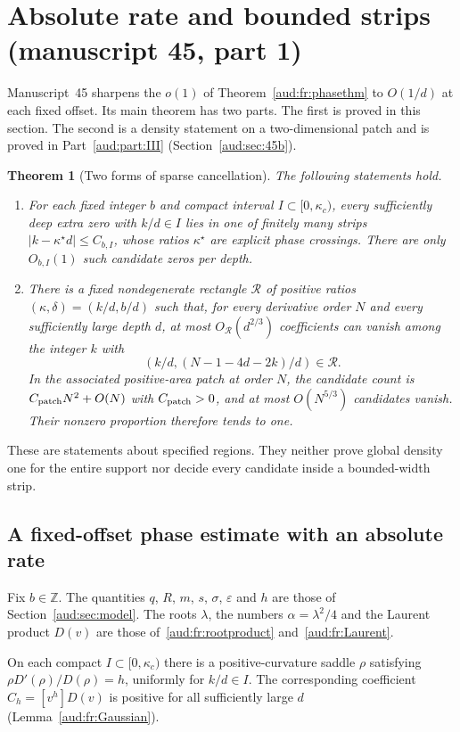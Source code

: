 \documentclass[11pt,a4paper]{article}
\numberwithin{equation}{section}
\newtheorem{theorem}{Theorem}[section]
\begin{document}
\section{Absolute rate and bounded strips (manuscript 45, part 1)}\label{aud:sec:45a}
Manuscript~45 sharpens the $o(1)$ of Theorem~\ref{aud:fr:phasethm} to $O(1/d)$ at each fixed offset. Its main theorem has two parts. The first is proved in this section. The second is a density statement on a two-dimensional patch and is proved in Part~\ref{aud:part:III} (Section~\ref{aud:sec:45b}).

\begin{theorem}[Two forms of sparse cancellation]\label{aud:sc:main}
The following statements hold.
\begin{enumerate}
\item For each fixed integer $b$ and compact interval $I\subset[0,\kappa_c)$, every sufficiently deep extra zero with $k/d\in I$ lies in one of finitely many strips $|k-\kappa^\star d|\le C_{b,I}$, whose ratios $\kappa^\star$ are explicit phase crossings. There are only $O_{b,I}(1)$ such candidate zeros per depth.
\item There is a fixed nondegenerate rectangle $\mathcal R$ of positive ratios $(\kappa,\delta)=(k/d,b/d)$ such that, for every derivative order $N$ and every sufficiently large depth $d$, at most $O_{\mathcal R}(d^{2/3})$ coefficients can vanish among the integer $k$ with
\[
 (k/d,(N-1-4d-2k)/d)\in\mathcal R.
\]
In the associated positive-area patch at order $N$, the candidate count is $C_{\rm patch}N^2+O(N)$ with $C_{\rm patch}>0$, and at most $O(N^{5/3})$ candidates vanish. Their nonzero proportion therefore tends to one.
\end{enumerate}
\end{theorem}

These are statements about specified regions. They neither prove global density one for the entire support nor decide every candidate inside a bounded-width strip.
\subsection{A fixed-offset phase estimate with an absolute rate}
Fix $b\in\mathbb Z$. The quantities $q$, $R$, $m$, $s$, $\sigma$, $\varepsilon$ and $h$ are those of Section~\ref{aud:sec:model}. The roots $\lambda$, the numbers $\alpha=\lambda^2/4$ and the Laurent product $D(v)$ are those of~\eqref{aud:fr:rootproduct} and~\eqref{aud:fr:Laurent}.

On each compact $I\subset[0,\kappa_c)$ there is a positive-curvature saddle $\rho$ satisfying $\rho D'(\rho)/D(\rho)=h$, uniformly for $k/d\in I$. The corresponding coefficient $C_h=[v^h]D(v)$ is positive for all sufficiently large $d$ (Lemma~\ref{aud:fr:Gaussian}).
\end{document}
